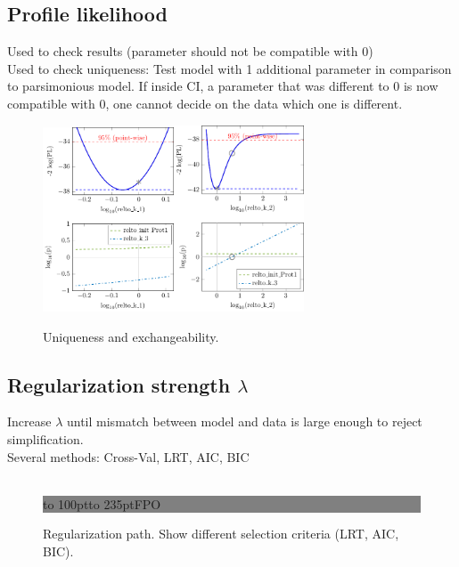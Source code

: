 \documentclass{bioinfo}
\begin{document}
\subsection{Profile likelihood}

Used to check results (parameter should not be compatible with 0)\\
Used to check uniqueness: Test model with 1 additional parameter in comparison to parsimonious model.
If inside CI, a parameter that was different to 0 is now compatible with 0, one cannot decide on the data which one is different.

\begin{figure}[!tpb]%
\centerline{\includegraphics[width=110pt]{Figures/relto_k_1.pdf}\includegraphics[width=110pt]{Figures/relto_k_2.pdf}}
\caption{Uniqueness and exchangeability.}\label{fig:01}
\end{figure}

\subsection{Regularization strength $\lambda$}
Increase $\lambda$ until mismatch between model and data is large enough to reject simplification.\\
Several methods: Cross-Val, LRT, AIC, BIC \\ \\

\begin{figure}[!tpb]%
\fboxsep=0pt\colorbox{gray}{\begin{minipage}[t]{235pt} \vbox to 100pt{\vfill\hbox to
235pt{\hfill\fontsize{24pt}{24pt}\selectfont FPO\hfill}\vfill}
\end{minipage}}
\caption{Regularization path. Show different selection criteria (LRT, AIC, BIC).}\label{fig:01}
\end{figure}
\end{document}
